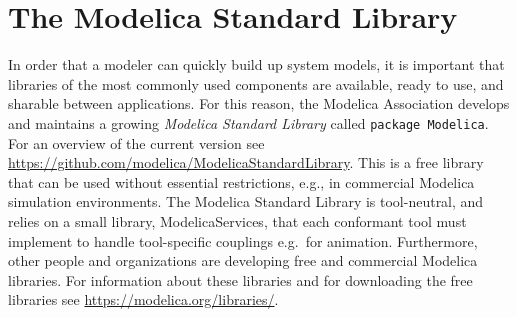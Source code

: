 \chapter{The Modelica Standard Library}\label{the-modelica-standard-library}

In order that a modeler can quickly build up system models, it is
important that libraries of the most commonly used components are
available, ready to use, and sharable between applications. For this
reason, the Modelica Association develops and maintains a growing
\emph{Modelica Standard Library} called \lstinline!package Modelica!. For an
overview of the current version see
\url{https://github.com/modelica/ModelicaStandardLibrary}.
This is a free library that can be used without essential restrictions, e.g., in
commercial Modelica simulation environments. The Modelica Standard
Library is tool-neutral, and relies on a small library,
ModelicaServices, that each conformant tool must implement to handle
tool-specific couplings e.g.\ for animation. Furthermore, other people
and organizations are developing free and commercial Modelica libraries.
For information about these libraries and for downloading the free
libraries see \url{https://modelica.org/libraries/}.
